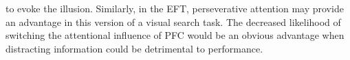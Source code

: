 to evoke the illusion.  Similarly, in the EFT, perseverative attention may provide an advantage in this version of a visual search task.  The decreased likelihood of switching the attentional influence of PFC would be an obvious advantage when distracting information could be detrimental to performance.

%


